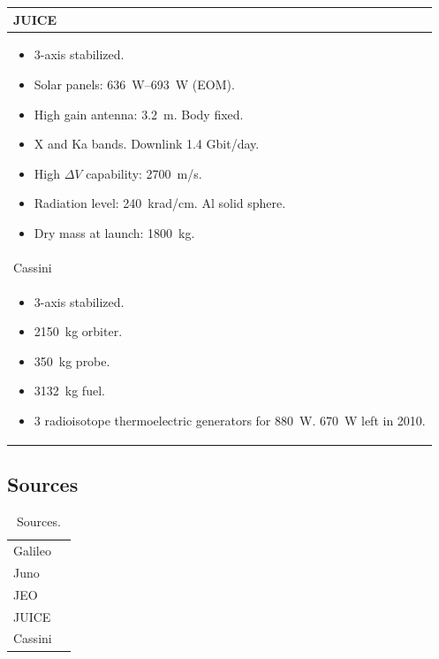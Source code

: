 \begin{longtable}{p{}}
  JUICE \\* \midrule

  \begin{itemize}
  \item 3-axis stabilized.
  \item Solar panels: \SI{636}{W}--\SI{693}{W} (EOM).
  \item High gain antenna: \SI{3.2}{m}. Body fixed.
  \item X and Ka bands. Downlink 1.4 Gbit/day.
  \item High $\Delta V$ capability: \SI{2700}{m/s}.
  \item Radiation level: \SI{240}{krad/cm}. Al solid sphere.
  \item Dry mass at launch: \SI{1800}{kg}.
  \end{itemize} \\ \pagebreak

  Cassini \\* \midrule

  \begin{itemize}
  \item 3-axis stabilized.
  \item \SI{2150}{kg} orbiter.
  \item \SI{350}{kg} probe.
  \item \SI{3132}{kg} fuel.
  \item 3 radioisotope thermoelectric generators for
    \SI{880}{W}. \SI{670}{W} left in 2010.
  \end{itemize} \\
\end{longtable}

\subsection{Sources}

\begin{longtable}{ll}
  \caption{Sources.} \\

  Galileo & \cite{galileonasa,galileojpl} \\

  Juno & \cite{junonasa} \\

  JEO & \cite{jeonasa} \\

  JUICE & \cite{juiceesa} \\

  Cassini & \cite{cassininasa} \\
\end{longtable}

